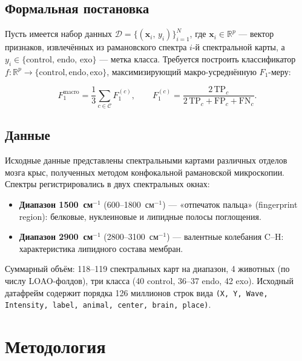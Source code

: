 \documentclass[12pt, a4paper]{article}
\begin{document}
\subsection{Формальная постановка}

Пусть имеется набор данных
$\mathcal{D} = \{(\mathbf{x}_i,\, y_i)\}_{i=1}^{N}$,
где $\mathbf{x}_i \in \mathbb{R}^p$ — вектор признаков,
извлечённых из рамановского спектра $i$-й спектральной карты,
а $y_i \in \{\text{control},\, \text{endo},\, \text{exo}\}$ —
метка класса.
Требуется построить классификатор
$f\colon \mathbb{R}^p \to \{\text{control}, \text{endo}, \text{exo}\}$,
максимизирующий макро-усреднённую $F_1$-меру:

\begin{equation}
  F_1^{\text{macro}} = \frac{1}{3}\sum_{c \in \mathcal{C}} F_1^{(c)},
  \qquad
  F_1^{(c)} = \frac{2\,\mathrm{TP}_c}{2\,\mathrm{TP}_c + \mathrm{FP}_c + \mathrm{FN}_c}.
  \label{eq:f1macro}
\end{equation}

\subsection{Данные}

Исходные данные представлены спектральными картами различных
отделов мозга крыс, полученных методом конфокальной рамановской
микроскопии. Спектры регистрировались в двух спектральных окнах:

\begin{itemize}[leftmargin=1.5cm]
  \item \textbf{Диапазон 1500~см$^{-1}$} (600–1800~см$^{-1}$) —
        «отпечаток пальца» (fingerprint region): белковые, нуклеиновые
        и липидные полосы поглощения.
  \item \textbf{Диапазон 2900~см$^{-1}$} (2800–3100~см$^{-1}$) —
        валентные колебания C–H: характеристика липидного состава мембран.
\end{itemize}

Суммарный объём: 118–119 спектральных карт на диапазон,
4 животных (по числу LOAO-фолдов), три класса
(40 control, 36–37 endo, 42 exo).
Исходный датафрейм содержит порядка 126 миллионов строк вида
\texttt{(X, Y, Wave, Intensity, label, animal, center, brain, place)}.


\section{Методология}
\end{document}
